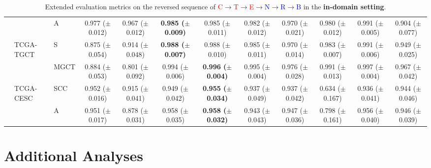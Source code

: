 \documentclass[10pt,twocolumn,letterpaper]{article}
\begin{document}
\begin{table}[!ht]
{{\begin{tabular}{lllccccccccc}
                &                  & A                   & 0.977 ($\pm$0.012)           & 0.967 ($\pm$0.012)           & \textbf{0.985 ($\pm$0.009)} & 0.985 ($\pm$0.011)          & 0.982 ($\pm$0.012)          & 0.970 ($\pm$0.021)  & 0.980 ($\pm$0.012)          & 0.991 ($\pm$0.005)  & 0.904 ($\pm$0.077)    \\
                & TCGA-TGCT        & S & 0.875 ($\pm$0.054)           & 0.914 ($\pm$0.048)           & \textbf{0.988 ($\pm$0.007)} & 0.988 ($\pm$0.010)          & 0.985 ($\pm$0.011)          & 0.970 ($\pm$0.014)  & 0.983 ($\pm$0.007)          & 0.991 ($\pm$0.006)  & 0.949 ($\pm$0.025)    \\
                &                  & MGCT            & 0.884 ($\pm$0.053)           & 0.801 ($\pm$0.092)           & 0.994 ($\pm$0.006)          & \textbf{0.996 ($\pm$0.004)} & 0.995 ($\pm$0.004)          & 0.976 ($\pm$0.028)  & 0.991 ($\pm$0.013)          & 0.997 ($\pm$0.004)  & 0.967 ($\pm$0.042)    \\
                & TCGA-CESC        & SCC          & 0.952 ($\pm$0.016)           & 0.915 ($\pm$0.041)           & 0.949 ($\pm$0.042)          & \textbf{0.955 ($\pm$0.034)} & 0.937 ($\pm$0.049)          & 0.937 ($\pm$0.042)  & 0.634 ($\pm$0.167)          & 0.936 ($\pm$0.041)  & 0.944 ($\pm$0.046)    \\
                &                  & A                   & 0.951 ($\pm$0.017)           & 0.878 ($\pm$0.031)           & 0.958 ($\pm$0.035)          & \textbf{0.958 ($\pm$0.032)} & 0.943 ($\pm$0.043)          & 0.947 ($\pm$0.036)  & 0.798 ($\pm$0.161)          & 0.956 ($\pm$0.040)  & 0.946 ($\pm$0.039)   \\ \bottomrule
\end{tabular}}}
\caption{{Extended evaluation metrics on the reversed sequence of \textcolor{red}{C}$\rightarrow$\textcolor{red}{T}$\rightarrow$\textcolor{red}{E}$\rightarrow$\textcolor{blue}{N}$\rightarrow$\textcolor{blue}{R}$\rightarrow$\textcolor{blue}{B} in the \textbf{in-domain setting}.}}
\label{tab:extended3}
\end{table}

\section{Additional Analyses}\label{sec:others}
\end{document}
